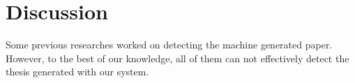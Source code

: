 \chapter{Discussion} \label{chapter:discussion}

Some previous researches\cite{xiong2009effective} worked on detecting the machine generated paper. However, to the best of our knowledge, all of them can not effectively detect the thesis generated with our system.